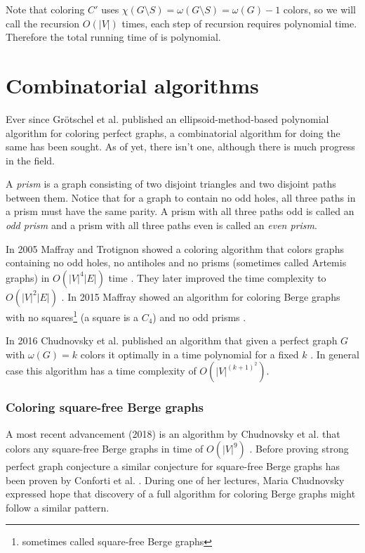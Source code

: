 Note that coloring $C'$ uses $\chi(G \setminus S) = \omega(G \setminus S) = \omega(G) -1$ colors, so we will call the recursion $O(|V|)$ times, each step of recursion requires polynomial time. Therefore the total running time of  is polynomial.

\section{Combinatorial algorithms}
\label{sec:classicalColoring}

Ever since Grötschel et al. published an ellipsoid-method-based polynomial algorithm for coloring perfect graphs, a combinatorial algorithm for doing the same has been sought. As of yet, there isn't one, although there is much progress in the field.

A \emph{prism} is a graph consisting of two disjoint triangles and two disjoint paths between them. Notice that for a graph to contain no odd holes, all three paths in a prism must have the same parity. A prism with all three paths odd is called an \emph{odd prism} and a prism with all three paths even is called an \emph{even prism}.

In 2005 Maffray and Trotignon showed a coloring algorithm that colors graphs containing no odd holes, no antiholes and no prisms (sometimes called Artemis graphs) in $O(|V|^4|E|)$ time \cite{Maffray2006}. They later improved the time complexity to $O(|V|^2|E|)$ \cite{coloringArtemis}. In 2015 Maffray showed an algorithm for coloring Berge graphs with no squares\footnote{sometimes called square-free Berge graphs} (a square is a $C_4$) and no odd prisms \cite{Maff2015}.

In 2016 Chudnovsky et al. published an algorithm that given a perfect graph $G$ with $\omega(G) = k$ colors it optimally in a time polynomial for a fixed $k$ \cite{Chudnovsky2017}. In general case this algorithm has a time complexity of $O(|V|^{(k+1)^2})$.

\subsubsection{Coloring square-free Berge graphs}

A most recent advancement (2018) is an algorithm by Chudnovsky et al. that colors any square-free Berge graphs in time of $O(|V|^9)$ \cite{coloringSquareFree}. Before proving strong perfect graph conjecture a similar conjecture for square-free Berge graphs has been proven by Conforti et al. \cite{Conforti2004}. During one of her lectures, Maria Chudnovsky expressed hope that discovery of a full algorithm for coloring Berge graphs might follow a similar pattern.

